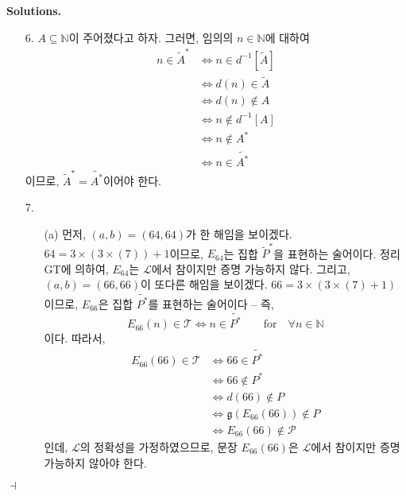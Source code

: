 \documentclass[12pt]{paper}
\newcommand{\gnum}
{ \mathfrak{g}
}
\newenvironment{context}[1][]
{ \noindent \textbf{{#1}.}
}
{ \hfill $ \dashv $
}
\begin{document}
\begin{context}[Solutions]
\begin{enumerate}
\item[{6.}] $A \subseteq \mathbb{N}$이 주어졌다고 하자.
그러면, 임의의 $n \in \mathbb{N}$에 대하여
\begin{align*}
n \in \tilde{A}^{*}
& \iff n \in d^{-1} \left[ \tilde{A} \right] \\
& \iff d \left( n \right) \in \tilde{A} \\
& \iff d \left( n \right) \notin A \\
& \iff n \notin d^{-1} \left[ A \right] \\
& \iff n \notin A^{*} \\
& \iff n \in \widetilde{A^{*}}
\end{align*}
이므로, $\tilde{A}^{*} = \widetilde{A^{*}}$이어야 한다.

\item[{7.}]
\begin{itemize}
\item[(a)] 먼저, $\left( a , b \right) = \left( 64 , 64 \right)$가 한 해임을 보이겠다. 
$64 = 3 \times \left( 3 \times \left( 7 \right) \right) + 1$이므로,
$E_{64}$는 집합 $\tilde{P}^{*}$을 표현하는 술어이다.
정리 GT에 의하여, $E_{64}$는 $\mathcal{L}$에서 참이지만 증명 가능하지 않다.
그리고, $\left( a , b \right) = \left( 66 , 66 \right)$이 또다른 해임을 보이겠다.
$66 = 3 \times \left( 3 \times \left( 7 \right) + 1 \right)$이므로,
$E_{66}$은 집합 $\widetilde{P^{*}}$를 표현하는 술어이다 --
즉, $$ E_{66} \left( n \right) \in \mathcal{T} \iff n \in \widetilde{P^{*}} \qquad \mathrm{for} \quad \forall n \in \mathbb{N} $$이다.
따라서,
\begin{align*}
E_{66} \left( 66 \right) \in \mathcal{T}
& \iff 66 \in \widetilde{P^{*}} \\
& \iff 66 \notin P^{*} \\
& \iff d \left( 66 \right) \notin P \\
& \iff \gnum \left( E_{66} \left( 66 \right) \right) \notin P \\
& \iff E_{66} \left( 66 \right) \notin \mathcal{P}
\end{align*}
인데, $\mathcal{L}$의 정확성을 가정하였으므로,
문장 $E_{66} \left( 66 \right)$은 $\mathcal{L}$에서 참이지만 증명 가능하지 않아야 한다.


\end{itemize}
\end{enumerate}
\end{context}
\end{document}
